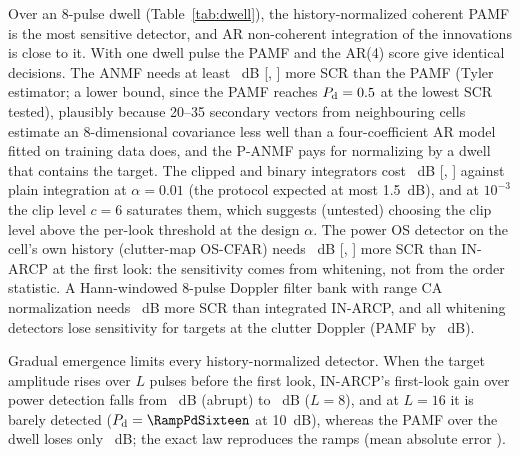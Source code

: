 \documentclass[journal]{IEEEtran}
\begin{document}
\begin{table}[!t]
\centering\footnotesize
\caption{SCR (dB) for $P_{\rm d}=0.5$ and $0.9$ over an 8-pulse dwell, persistent Swerling-1 target with random Doppler from the first dwell pulse (IPIX, conformal thresholds). $\le-5$: reached at the lowest SCR tested; n.r.: not reached at 25~dB.}
\label{tab:dwell}
\setlength{\tabcolsep}{4pt}

\end{table}
\label{sec:classical}Over an 8-pulse dwell (Table~\ref{tab:dwell}), the history-normalized coherent PAMF is the most sensitive detector, and AR non-coherent integration of the innovations is close to it. With one dwell pulse the PAMF and the AR(4) score give identical decisions. The ANMF needs at least \AFpMinusPamf~dB [\AFpMinusPamfLo, \AFpMinusPamfHi] more SCR than the PAMF (Tyler estimator; a lower bound, since the PAMF reaches $P_{\rm d}=0.5$ at the lowest SCR tested), plausibly because 20--35 secondary vectors from neighbouring cells estimate an 8-dimensional covariance less well than a four-coefficient AR model fitted on training data does, and the P-ANMF pays for normalizing by a dwell that contains the target. The clipped and binary integrators cost \AClipMinusDin~dB [\AClipMinusDinLo, \AClipMinusDinHi] against plain integration at $\alpha=0.01$ (the protocol expected at most 1.5~dB), and at $10^{-3}$ the clip level $c=6$ saturates them, which suggests (untested) choosing the clip level above the per-look threshold at the design $\alpha$. The power OS detector on the cell's own history (clutter-map OS-CFAR) needs \AOsrawMinusIn~dB [\AOsrawMinusInLo, \AOsrawMinusInHi] more SCR than IN-ARCP at the first look: the sensitivity comes from whitening, not from the order statistic. A Hann-windowed 8-pulse Doppler filter bank with range CA normalization needs \ClINvsMTD~dB more SCR than integrated IN-ARCP, and all whitening detectors lose sensitivity for targets at the clutter Doppler (PAMF by \ClPAMFMatched~dB).

Gradual emergence limits every history-normalized detector. When the target amplitude rises over $L$ pulses before the first look, IN-ARCP's first-look gain over power detection falls from \RampGainOne~dB (abrupt) to \RampGainEight~dB ($L=8$), and at $L=16$ it is barely detected ($P_{\rm d}=\RampPdSixteen$ at 10~dB), whereas the PAMF over the dwell loses only \RampPAMFLoss~dB; the exact law reproduces the ramps (mean absolute error \RampMae).
\end{document}
